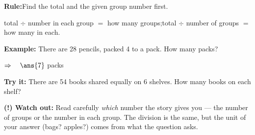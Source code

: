 \documentclass[12pt]{article}
\begin{document}
\begin{formulabox}
\textbf{Rule:}\quad Find the total and the given group number first.\par
total $\div$ number in each group $=$ how many groups;\quad total $\div$ number of groups $=$ how many in each.
\end{formulabox}

\begin{examplebox}
\textbf{Example:} There are 28 pencils, packed 4 to a pack. How many packs?

$\Rightarrow\quad\ans{7}$ packs
\end{examplebox}

\begin{tryitbox}
\textbf{Try it:} There are 54 books shared equally on 6 shelves. How many books on each shelf?\\[2pt]
\end{tryitbox}

\begin{watchoutbox}
\textbf{(!) Watch out:} Read carefully \emph{which} number the story gives you --- the number of groups or the number in each group. The division is the same, but the unit of your answer (bags? apples?) comes from what the question asks.
\end{watchoutbox}
\end{document}
